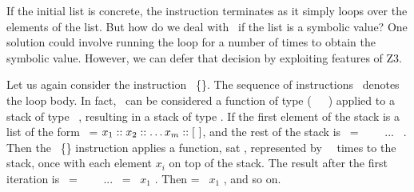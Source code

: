 \documentclass[a4paper,USenglish,cleveref, autoref, thm-restate]{lipics-v2021}
\begin{document}
If the initial list is concrete, the instruction terminates as it simply loops over the
elements of the list. But how do we deal with \ITER\ if the list is a
symbolic value?
One solution could involve running
the loop for a number of times to obtain the symbolic value. However,
we can defer that decision by exploiting features of Z3. 

Let us again consider the instruction \ITER\
\{\INSTRUCTION\}. The sequence of instructions \INSTRUCTION\ denotes
the loop body. In fact, \INSTRUCTION\ can be considered a function of
type (\TY\ \STACKCONCAT \TYA\ \SRightarrow\ \TYA) applied to a stack
of type \TY\ \STACKCONCAT \TYA,
resulting in a stack of type \TYA. If the first element of
the stack is a list of the form \LIST\ = $x_1 :: x_2 ::
\dots x_m ::  [\ ]$, and the rest of the stack is \STACKZERO\ =
\StackOne\  \STACKCONCAT\ \StackTwo\ \STACKCONCAT\ ... \STACKCONCAT\
\StackN. Then the \ITER\ \{\INSTRUCTION\} instruction applies a 
function, sat \F, represented by \INSTRUCTION\ \M\ times to the stack, once
with each element $x_i$ on top of the stack. The result after 
the first iteration is \STACKONE\ = \StackOneOne\  \STACKCONCAT\
\StackTwoOne\ \STACKCONCAT\ ... \STACKCONCAT\ \StackNOne = \F\ $x_1$
\STACK. Then \STACKTWO = \F\ $x_1$ \STACKONE, and so on.

\end{document}
